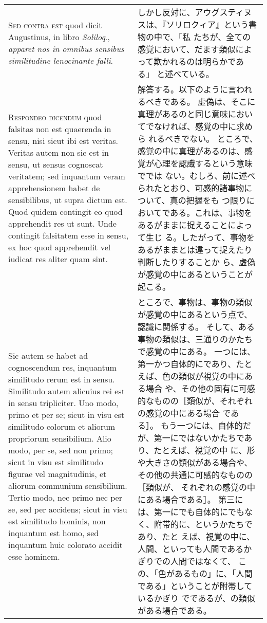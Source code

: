 \documentclass[paper=a4paper,fontsize=10pt,jafontsize=9pt,titlepage]{jlreq}
\begin{document}
\begin{longtable}{p{21em}p{21em}}
{\scshape  Sed contra est} quod dicit Augustinus, in libro {\itshape Soliloq}.,
{\itshape apparet nos in omnibus sensibus similitudine lenocinante falli}.


&
しかし反対に、アウグスティヌスは、『ソリロクィア』という書物の中で、「私
 たちが、全ての感覚において、だます類似によって欺かれるのは明らかである」
 と述べている。

\\


{\scshape Respondeo dicendum} quod falsitas non est quaerenda in sensu,
nisi sicut ibi est veritas. Veritas autem non sic est in sensu, ut
sensus cognoscat veritatem; sed inquantum veram apprehensionem habet de
sensibilibus, ut supra dictum est. Quod quidem contingit eo quod
apprehendit res ut sunt. Unde contingit falsitatem esse in sensu, ex hoc
quod apprehendit vel iudicat res aliter quam sint. 

&

解答する。以下のように言われるべきである。
虚偽は、そこに真理があるのと同じ意味においてでなければ、感覚の中に求めら
 れるべきでない。
ところで、感覚の中に真理があるのは、感覚が心理を認識するという意味ででは
 ない。むしろ、前に述べられたとおり、可感的諸事物について、真の把握をも
 つ限りにおいてである。これは、事物をあるがままに捉えることによって生じ
 る。したがって、事物をあるがままとは違って捉えたり判断したりすることか
 ら、虚偽が感覚の中にあるということが起こる。

\\



Sic autem se habet ad
cognoscendum res, inquantum similitudo rerum est in sensu. Similitudo
autem alicuius rei est in sensu tripliciter. Uno modo, primo et per se;
sicut in visu est similitudo colorum et aliorum propriorum
sensibilium. Alio modo, per se, sed non primo; sicut in visu est
similitudo figurae vel magnitudinis, et aliorum communium
sensibilium. Tertio modo, nec primo nec per se, sed per accidens; sicut
in visu est similitudo hominis, non inquantum est homo, sed inquantum
huic colorato accidit esse hominem. 

&

ところで、事物は、事物の類似が感覚の中にあるという点で、認識に関係する。
 そして、ある事物の類似は、三通りのかたちで感覚の中にある。
一つには、第一かつ自体的にであり、たとえば、色の類似が視覚の中にある場合
 や、その他の固有に可感的なものの［類似が、それぞれの感覚の中にある場合
 である］。
もう一つには、自体的だが、第一にではないかたちであり、たとえば、視覚の中
 に、形や大きさの類似がある場合や、その他の共通に可感的なものの［類似が、
 それぞれの感覚の中にある場合である］。
第三には、第一にでも自体的にでもなく、附帯的に、というかたちであり、たと
 えば、視覚の中に、人間、といっても人間であるかぎりでの人間ではなくて、
 この、「色があるもの」に、「人間である」ということが附帯しているかぎり
 でであるが、の類似がある場合である。



\end{longtable}
\end{document}
